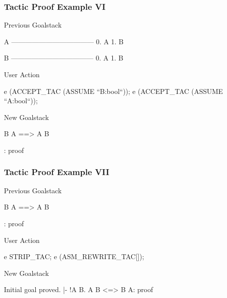 \begin{frame}[fragile]
\frametitle{Tactic Proof Example VI}

\begin{block}{Previous Goalstack}
\begin{semiverbatim}
\scriptsize{}A
------------------------------------
  0.  A
  1.  B

B
------------------------------------
  0.  A
  1.  B
\end{semiverbatim}
\end{block}

\begin{block}{User Action}
\begin{semiverbatim}
\scriptsize{}e (ACCEPT_TAC (ASSUME ``B:bool``));
e (ACCEPT_TAC (ASSUME ``A:bool``));
\end{semiverbatim}
\end{block}

\begin{block}{New Goalstack}
\begin{semiverbatim}
\scriptsize{}B \holAnd{} A ==> A \holAnd{} B

: proof
\end{semiverbatim}
\end{block}
\end{frame}


\begin{frame}[fragile]
\frametitle{Tactic Proof Example VII}

\begin{block}{Previous Goalstack}
\begin{semiverbatim}
\scriptsize{}B \holAnd{} A ==> A \holAnd{} B

: proof
\end{semiverbatim}
\end{block}

\begin{block}{User Action}
\begin{semiverbatim}
\scriptsize{}e STRIP_TAC;
e (ASM_REWRITE_TAC[]);
\end{semiverbatim}
\end{block}

\begin{block}{New Goalstack}
\begin{semiverbatim}
\scriptsize{}Initial goal proved.
|- !A B. A \holAnd{} B <=> B \holAnd{} A:
   proof
\end{semiverbatim}
\end{block}
\end{frame}



